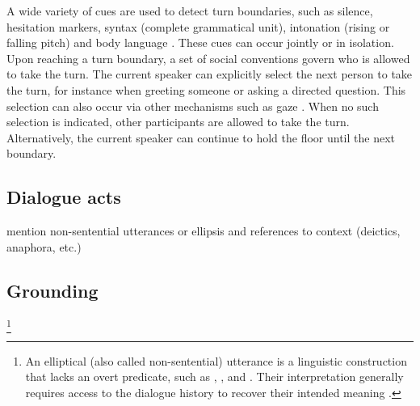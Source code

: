 A wide variety of cues are used to detect turn boundaries, such as silence, hesitation markers, syntax (complete grammatical unit), intonation (rising or falling pitch) and body language \citep{Duncan1972}.   These cues can occur jointly or in isolation. Upon reaching a turn boundary, a set of social conventions govern who is allowed to take the turn.  The current speaker can explicitly select the next person to take the turn, for instance when greeting someone or asking a directed question.   This selection can also occur via other mechanisms such as gaze \citep{sacks1974}.  When no such selection is indicated, other participants are allowed to take the turn.  Alternatively, the current speaker can continue to hold the floor until the next boundary. 






\subsection{Dialogue acts}


mention non-sentential utterances or ellipsis
and references to context (deictics, anaphora, etc.)


\subsection{Grounding}






\footnote{An elliptical (also called non-sentential) utterance is a linguistic construction that lacks an overt predicate, such as , ,  and . Their interpretation generally requires access to the dialogue history to recover their intended meaning \citep{Fernandez:2007}.}

